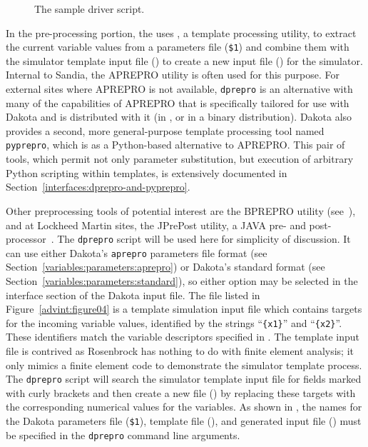 \begin{figure}
  \centering
  \begin{bigbox}
    \begin{small}
    \end{small}
  \end{bigbox}
  \caption{The \protect{} sample driver script.}
  \label{advint:figure02}
\end{figure}

In the pre-processing portion, the  uses
, a template processing utility, to extract the
current variable values from a parameters file (\texttt{\$1})
and combine them with the simulator template input file
() to create a new input file ()
for the simulator. Internal to Sandia, the APREPRO utility is often
used for this purpose. For external sites where APREPRO is not
available, \texttt{dprepro} is an alternative with many of the 
capabilities of APREPRO that is specifically tailored for use with Dakota
and is distributed with it (in , or
 in a binary distribution). Dakota also provides a second,
more general-purpose template processing tool named \texttt{pyprepro}, 
which is as a Python-based alternative to APREPRO. This pair of
tools, which permit not only parameter substitution, but execution of
arbitrary Python scripting within templates, is extensively documented in 
Section~\ref{interfaces:dprepro-and-pyprepro}.

Other preprocessing tools of potential interest are the BPREPRO
utility (see~\cite{WalXX}), and at Lockheed Martin sites, the JPrePost 
utility, a JAVA pre- and post-processor~\cite{Fla}. The \texttt{dprepro} script
will be used here for simplicity of discussion. It can use either 
Dakota's \texttt{aprepro} parameters file format (see
Section~\ref{variables:parameters:aprepro}) or Dakota's standard
format (see Section~\ref{variables:parameters:standard}), so either
option may be selected in the interface section of the Dakota input
file. The  file listed in
Figure~\ref{advint:figure04} is a template simulation input file which
contains targets for the incoming variable values, identified by the
strings ``\texttt{\{x1\}}'' and ``\texttt{\{x2\}}''. These
identifiers match the variable descriptors specified in
. The template input file is contrived
as Rosenbrock has nothing to do with finite element analysis; it only
mimics a finite element code to demonstrate the simulator
template process. The \texttt{dprepro} script will search the
simulator template input file for fields marked with curly
brackets and then create a new file () by replacing
these targets with the corresponding numerical values for the
variables. As shown in , the names for the Dakota
parameters file (\texttt{\$1}), template file
(), and generated input file ()
must be specified in the \texttt{dprepro} command line arguments.

